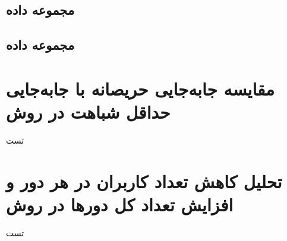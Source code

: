 \subsection{
	مجموعه داده
}



\subsection{
	مجموعه داده
}



\section{
	مقایسه جابه‌جایی حریصانه با جابه‌جایی حداقل شباهت در روش
}
تست


\section{
	تحلیل کاهش تعداد کاربران در هر دور و افزایش تعداد کل دورها در روش
}
تست
